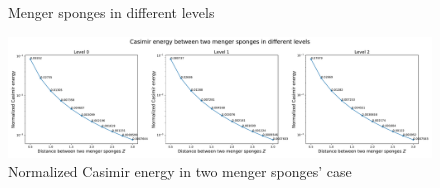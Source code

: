 \begin{figure}[H]
    \centering
    \qquad
    \qquad
    \caption{Menger sponges in different levels}
    \label{Menger sponges}
\end{figure}

\begin{figure}[H]
    \centering
    \hspace*{-1.5cm}\includegraphics[width=1.2\textwidth]{figures/Cas_menger_spongers.pdf}
    \caption{Normalized Casimir energy in two menger sponges' case}
    \label{Normalized Casimir energy in two menger sponges' case}
\end{figure}

